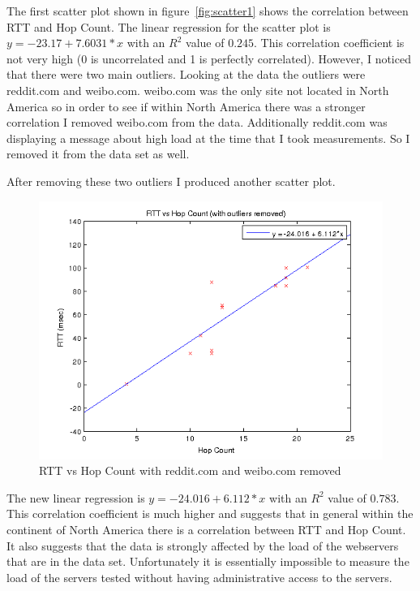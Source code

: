 \documentclass{article}
\begin{document}
The first scatter plot shown in figure~\ref{fig:scatter1} shows the correlation between RTT and Hop Count. The linear regression for the scatter plot is $y = -23.17 + 7.6031*x$ with an $R^2$ value of $0.245$. This correlation coefficient is not very high (0 is uncorrelated and 1 is perfectly correlated). However, I noticed that there were two main outliers. Looking at the data the outliers were reddit.com and weibo.com. weibo.com was the only site not located in North America so in order to see if within North America there was a stronger correlation I removed weibo.com from the data. Additionally reddit.com was displaying a message about high load at the time that I took measurements. So I removed it from the data set as well.

After removing these two outliers I produced another scatter plot.

\FloatBarrier
\begin{figure}[h!]
  \includegraphics{rtt_vs_hop_count_no_outliers.png}
  \caption{RTT vs Hop Count with reddit.com and weibo.com removed}
  \label{fig:scatter2}
\end{figure}
\FloatBarrier

The new linear regression is $y = -24.016 + 6.112*x$ with an $R^2$ value of $0.783$. This correlation coefficient is much higher and suggests that in general within the continent of North America there is a correlation between RTT and Hop Count. It also suggests that the data is strongly affected by the load of the webservers that are in the data set. Unfortunately it is essentially impossible to measure the load of the servers tested without having administrative access to the servers.
\end{document}
